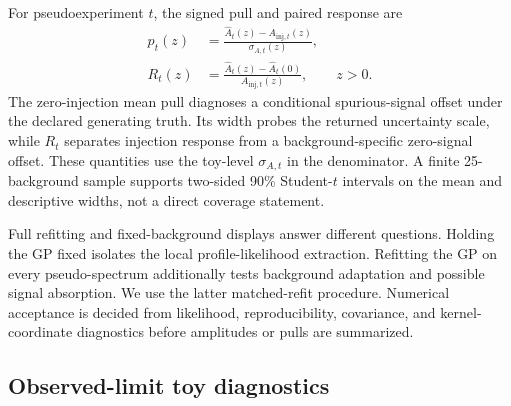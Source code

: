 For pseudoexperiment $t$, the signed pull and paired response are
\begin{align}
p_t(z)&=\frac{\widehat A_t(z)-A_{\mathrm{inj},t}(z)}
                  {\sigma_{A,t}(z)},
\label{eq:v4p9-pull}\\
R_t(z)&=\frac{\widehat A_t(z)-\widehat A_t(0)}
                  {A_{\mathrm{inj},t}(z)},\qquad z>0.
\label{eq:v4p9-paired-response}
\end{align}
The zero-injection mean pull diagnoses a conditional spurious-signal offset under the
declared generating truth.  Its width probes the returned uncertainty scale, while
$R_t$ separates injection response from a background-specific zero-signal offset.
These quantities use the toy-level $\sigma_{A,t}$ in the denominator.  A finite
25-background sample supports two-sided 90\% Student-$t$ intervals on the mean and descriptive
widths, not a direct coverage statement.

Full refitting and fixed-background displays answer different questions. Holding the GP
fixed isolates the local profile-likelihood extraction.  Refitting the GP on every
pseudo-spectrum additionally tests background adaptation and possible signal
absorption. We use the latter matched-refit procedure. Numerical acceptance is decided
from likelihood, reproducibility, covariance, and kernel-coordinate diagnostics before
amplitudes or pulls are summarized.

\subsection{Observed-limit toy diagnostics}

